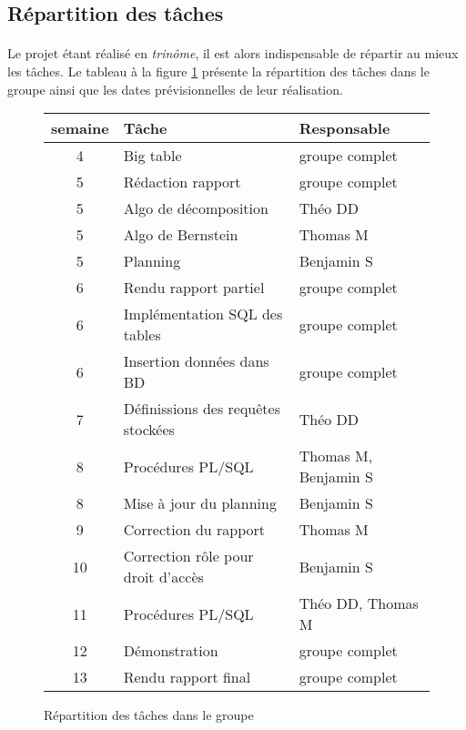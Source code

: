 \subsection{Répartition des tâches}

\paragraph{}{
    Le projet étant réalisé en \textit{trinôme}, il est alors indispensable de répartir au mieux les tâches.
    Le tableau à la figure \ref{planning} présente la répartition des tâches dans le groupe ainsi que les dates prévisionnelles
    de leur réalisation.
}

\begin{figure}
\centering
    \begin{tabular}{|c|p{16em}|p{12em}|}
    	\hline \textbf{semaine} & \textbf{Tâche} & \textbf{Responsable} \\ 
    	\hline 4 & Big table & groupe complet \\ 
    	\hline 5 & Rédaction rapport & groupe complet \\ 
    	\hline 5 & Algo de décomposition & Théo DD \\ 
    	\hline 5 & Algo de Bernstein & Thomas M \\ 
    	\hline 5 & Planning & Benjamin S \\ 
    	\hline 6 & Rendu rapport partiel & groupe complet \\
    	\hline 6 & Implémentation SQL des tables & groupe complet \\
    	\hline 6 & Insertion données dans BD & groupe complet \\ 
    	\hline 7 & Définissions des requêtes stockées & Théo DD \\ 
    	\hline 8 & Procédures PL/SQL & Thomas M, Benjamin S \\ 
    	\hline 8 & Mise à jour du planning & Benjamin S \\
    	\hline 9 & Correction du rapport & Thomas M \\
    	\hline 10 & Correction rôle pour droit d'accès & Benjamin S \\
    	\hline 11 & Procédures PL/SQL & Théo DD, Thomas M \\
    	\hline 12 & Démonstration & groupe complet \\
    	\hline 13 & Rendu rapport final & groupe complet \\
    	\hline 
    \end{tabular} 
\caption{Répartition des tâches dans le groupe}
\label{planning}
\end{figure}

